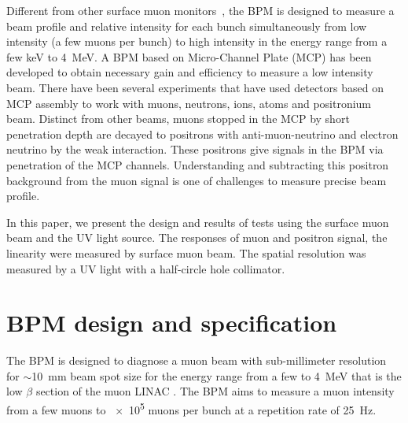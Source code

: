\documentclass[preprint,3p,twocolumn]{elsarticle}
\begin{document}
Different from other surface muon monitors~\cite{muon_bpm1,
  muon_bpm3}, the BPM is designed to measure a beam profile and
relative intensity for each bunch simultaneously from low
intensity (a few muons per bunch) to high intensity in the energy
range from a few \si{keV} to \SI{4}{\MeV}.  A BPM based on
Micro-Channel Plate (MCP) has been developed to obtain necessary
gain and efficiency to measure a low intensity beam.  There have
been several experiments that have used detectors based on MCP
assembly to work with muons, neutrons, ions, atoms and
positronium~\cite{muon_bpm2, neutron, Ps} beam.  Distinct from
other beams, muons stopped in the MCP by short penetration depth
are decayed to positrons with anti-muon-neutrino and electron
neutrino by the weak interaction. These positrons give signals in
the BPM via penetration of the MCP channels.  Understanding and
subtracting this positron background from the muon signal is one
of challenges to measure precise beam profile.

In this paper, we present the design and results of tests using
the surface muon beam and the UV light source.  The responses of
muon and positron signal, the linearity were measured by surface
muon beam.  The spatial resolution was measured by a UV light
with a half-circle hole collimator.


\section{BPM design and specification}

The BPM is designed to diagnose a muon beam with sub-millimeter
resolution for $\sim$\SI{10}{\mm} beam spot size for the energy
range from a few to \SI{4}{\MeV} that is the low $\beta$ section
of the muon LINAC \cite{IH}.  The BPM aims to measure a muon
intensity from a few muons to \num{e5} muons per bunch at a
repetition rate of \SI{25}{\hertz}.
\end{document}
